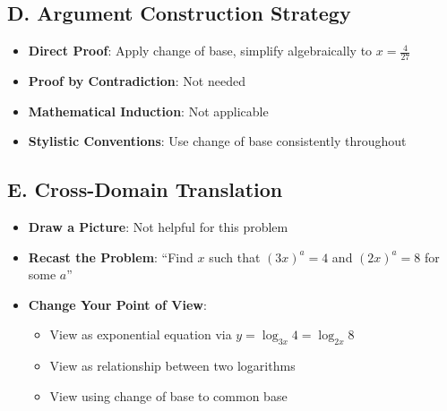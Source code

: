 \documentclass[12pt]{article}
\begin{document}
\begin{strategicbox}
\subsection*{D. Argument Construction Strategy}
\begin{itemize}[leftmargin=*]
    \item \textbf{Direct Proof}: Apply change of base, simplify algebraically to $x = \frac{4}{27}$
    \item \textbf{Proof by Contradiction}: Not needed
    \item \textbf{Mathematical Induction}: Not applicable
    \item \textbf{Stylistic Conventions}: Use change of base consistently throughout
\end{itemize}

\subsection*{E. Cross-Domain Translation}
\begin{itemize}[leftmargin=*]
    \item \textbf{Draw a Picture}: Not helpful for this problem
    \item \textbf{Recast the Problem}: ``Find $x$ such that $(3x)^a = 4$ and $(2x)^a = 8$ for some $a$''
    \item \textbf{Change Your Point of View}: 
    \begin{itemize}
        \item View as exponential equation via $y = \log_{3x} 4 = \log_{2x} 8$
        \item View as relationship between two logarithms
        \item View using change of base to common base
    \end{itemize}
\end{itemize}
\end{strategicbox}
\end{document}
